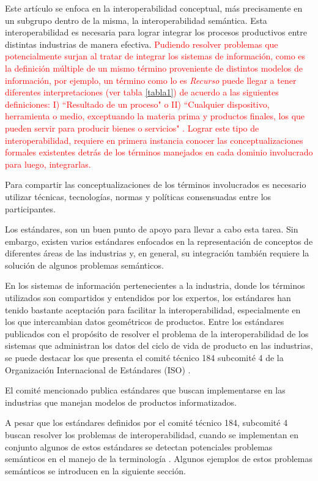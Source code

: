 \documentclass[journal]{IEEEtran}
\begin{document}
Este art\'iculo se enfoca en la interoperabilidad conceptual, m\'as precisamente en un subgrupo dentro de la misma, la interoperabilidad sem\'antica. Esta interoperabilidad es necesaria para lograr integrar los procesos productivos entre distintas industrias de manera efectiva. \textcolor{red}{ Pudiendo resolver problemas que potencialmente surjan al tratar de integrar los sistemas de informaci\'on, como es la definici\'on m\'ultiple de un mismo t\'ermino proveniente de distintos modelos de informaci\'on, por ejemplo, un t\'ermino como lo es \emph{Recurso} puede llegar a tener diferentes interpretaciones (ver tabla \ref{tabla1}) de acuerdo a las siguientes definiciones: I) ``Resultado de un proceso" \cite{ISOSupport} o II) ``Cualquier dispositivo, herramienta o medio, exceptuando la materia prima y productos finales, los que pueden servir para producir bienes o servicios" \cite{ISO2004}. Lograr este tipo de interoperabilidad, requiere en primera instancia conocer las conceptualizaciones formales existentes detr\'as de los t\'erminos manejados en cada dominio involucrado para luego, integrarlas.}

Para compartir las conceptualizaciones de los t\'erminos involucrados es necesario utilizar t\'ecnicas, tecnolog\'ias, normas y pol\'iticas consensuadas entre los participantes. 

Los est\'andares, son un buen punto de apoyo para llevar a cabo esta tarea. Sin embargo, existen varios est\'andares enfocados en la representaci\'on de conceptos de diferentes \'areas de las industrias y, en general, su integraci\'on tambi\'en requiere la soluci\'on de algunos problemas sem\'anticos. 

En los sistemas de informaci\'on pertenecientes a la industria, donde los t\'erminos utilizados son compartidos y entendidos por los expertos, los est\'andares han tenido bastante aceptaci\'on para facilitar la interoperabilidad, especialmente en los que intercambian datos geom\'etricos de productos. Entre los est\'andares publicados con el prop\'osito de resolver el problema de la interoperabilidad de los sistemas que administran los datos del ciclo de vida de producto en las industrias, se puede destacar los que presenta el comit\'e t\'ecnico 184 subcomit\'e 4 de la Organizaci\'on Internacional de Est\'andares (ISO) \cite{Cutting-Decelle2007}. 

El comit\'e mencionado publica est\'andares que buscan implementarse en las industrias que manejan modelos de productos informatizados. 

A pesar que los est\'andares definidos por el comit\'e t\'ecnico 184, subcomit\'e 4 buscan resolver los problemas de interoperabilidad, cuando se implementan en conjunto algunos de estos est\'andares se detectan potenciales problemas sem\'anticos en el manejo de la terminolog\'ia \cite{Young2007}. Algunos ejemplos de estos problemas sem\'anticos se introducen en la siguiente secci\'on. 
\end{document}
